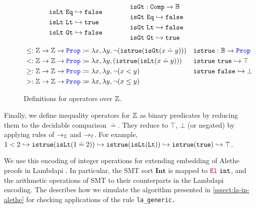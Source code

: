 \begin{figure}[tb]
\[\begin{array}{l@{\hspace{4em}}l@{\hspace{4em}}l}
\begin{aligned}
  &\tt{isLt}~\tt{Eq} \re \tt{false} \\
  &\tt{isLt}~\tt{Lt} \re \tt{true} \\
  &\tt{isLt}~\tt{Gt} \re \tt{false} \\
\end{aligned}
&
\begin{aligned}
  &\tt{isGt} : \tt{Comp} \ra \bb{B} \\
  &\tt{isGt}~\tt{Eq} \re \tt{false} \\
  &\tt{isGt}~\tt{Lt} \re \tt{false} \\
  &\tt{isGt}~\tt{Gt} \re \tt{true} 
\end{aligned}
\end{array}
\]
\noindent
\begin{align*}
&\leq: \bb{Z} \ra \bb{Z} \ra \prop  \coloneq \lambda x,\lambda y, \neg (\tt{istrue}(\tt{isGt}(x \doteq y))) & &\tt{istrue} : \bb{B} \ra \prop \\
&<: \bb{Z} \ra \bb{Z} \ra \prop  \coloneq \lambda x,\lambda y, (\tt{istrue}(\tt{isLt}(x \doteq y))) & &\tt{istrue}~\tt{true} \re \top \\
&\geq: \bb{Z} \ra \bb{Z} \ra \prop  \coloneq \lambda x,\lambda y, \neg (x < y) & &\tt{istrue}~\tt{false} \re \bot \\
&>: \bb{Z} \ra \bb{Z} \ra \prop  \coloneq \lambda x,\lambda y, \neg (x \leq y) & &
\end{align*}
\caption{Definitions for operators over $\bb{Z}$.}
\label{fig:arith-ops}
\end{figure}

Finally, we define inequality operators for $\bb{Z}$ as binary predicates by reducing them to the decidable comparison $\doteq$. They reduce to $\top$, $\bot$ (or negated) by applying rules of $\ra_\bb{Z}$ and $\ra_\bb{P}$.
For example, $1 < 2 \hookrightarrow \tt{istrue}(\tt{isLt}(1 \doteq 2)) \hookrightarrow \tt{istrue}(\tt{isLt}(\tt{Lt})) \hookrightarrow \tt{istrue}(\tt{true}) \hookrightarrow \top$. %

We use this encoding of integer operations for extending  embedding of Alethe proofs in Lambdapi \cite{ColtellacciMD24}. In particular, the SMT sort $\textbf{Int}$ is mapped to $\el~\texttt{int}$, and the arithmetic operations of SMT to their counterparts in the Lambdapi encoding. The  describes how we  simulate the algorithm presented in \cref{sssect:la-in-alethe} for checking applications of the rule \tt{la\_generic}.

